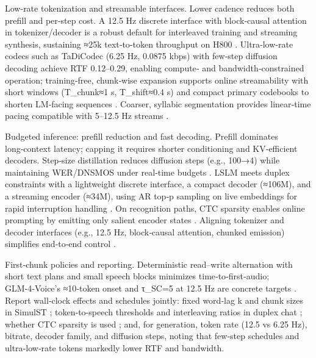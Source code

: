 Low-rate tokenization and streamable interfaces. Lower cadence reduces both prefill and per‑step cost. A 12.5 Hz discrete interface with block‑causal attention in tokenizer/decoder is a robust default for interleaved training and streaming synthesis, sustaining ≈25k text‑to‑token throughput on H800 \cite{zeng2024scalingspeechtextpretrainingsyntheticint}. Ultra‑low‑rate codecs such as TaDiCodec (6.25 Hz, 0.0875 kbps) with few‑step diffusion decoding achieve RTF 0.12–0.29, enabling compute‑ and bandwidth‑constrained operation; training‑free, chunk‑wise expansion supports online streamability with short windows (T_chunk≈1 s, T_shift≈0.4 s) and compact primary codebooks to shorten LM‑facing sequences \cite{wang2025tadicodectextawarediffusionspeechtokeniz,kando2025exploringeffectsegmentationvocabularysiz}. Coarser, syllabic segmentation provides linear‑time pacing compatible with 5–12.5 Hz streams \cite{cho2025sylbersyllabicembeddingrepresentationspe}.

Budgeted inference: prefill reduction and fast decoding. Prefill dominates long‑context latency; capping it requires shorter conditioning and KV‑efficient decoders. Step‑size distillation reduces diffusion steps (e.g., 100→4) while maintaining WER/DNSMOS under real‑time budgets \cite{yang2025diffsoundstreamefficientspeechtokenizati}. LSLM meets duplex constraints with a lightweight discrete interface, a compact decoder (≈106M), and a streaming encoder (≈34M), using AR top‑p sampling on live embeddings for rapid interruption handling \cite{ma2024languagemodelcanlistenwhilespeaking}. On recognition paths, CTC sparsity enables online prompting by emitting only salient encoder states \cite{tsunoo2024decoderonlyarchitecturespeechrecognition}. Aligning tokenizer and decoder interfaces (e.g., 12.5 Hz, block‑causal attention, chunked emission) simplifies end‑to‑end control \cite{zeng2024scalingspeechtextpretrainingsyntheticint}.

First‑chunk policies and reporting. Deterministic read–write alternation with short text plans and small speech blocks minimizes time‑to‑first‑audio; GLM‑4‑Voice’s ≈10‑token onset and τ_SC=5 at 12.5 Hz are concrete targets \cite{zeng2024glm4voicetowardsintelligenthumanlikeends,cui2025thinkbeforeyoutalkenhancingmeaningfuldia}. Report wall‑clock effects and schedules jointly: fixed word‑lag k and chunk sizes in SimulST \cite{guo2025streamuniachievingstreamingspeechtransla}; token‑to‑speech thresholds and interleaving ratios in duplex chat \cite{zeng2024glm4voicetowardsintelligenthumanlikeends}; whether CTC sparsity is used \cite{tsunoo2024decoderonlyarchitecturespeechrecognition}; and, for generation, token rate (12.5 vs 6.25 Hz), bitrate, decoder family, and diffusion steps, noting that few‑step schedules and ultra‑low‑rate tokens markedly lower RTF and bandwidth.

